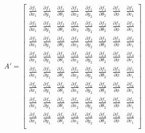 \begin{equation}
   A' = 
    \begin{bmatrix}
    \frac{\partial f_1}{\partial x_1} & \frac{\partial f_1}{\partial y_1} & \frac{\partial f_1}{\partial \theta_1} & \frac{\partial f_1}{\partial x_2} & \frac{\partial f_1}{\partial y_2} & \frac{\partial f_1}{\partial \theta_2} & \frac{\partial f_1}{\partial \phi} & \frac{\partial f_1}{\partial v_1} \\
    \frac{\partial f_2}{\partial x_1} & \frac{\partial f_2}{\partial y_1} & \frac{\partial f_2}{\partial \theta_1} & \frac{\partial f_2}{\partial x_2} & \frac{\partial f_2}{\partial y_2} & \frac{\partial f_2}{\partial \theta_2} & \frac{\partial f_2}{\partial \phi} & \frac{\partial f_2}{\partial v_1} \\
    \frac{\partial f_3}{\partial x_1} & \frac{\partial f_3}{\partial y_1} & \frac{\partial f_3}{\partial \theta_1} & \frac{\partial f_3}{\partial x_2} & \frac{\partial f_3}{\partial y_2} & \frac{\partial f_3}{\partial \theta_2} & \frac{\partial f_3}{\partial \phi} & \frac{\partial f_3}{\partial v_1} \\
    \frac{\partial f_4}{\partial x_1} & \frac{\partial f_4}{\partial y_1} & \frac{\partial f_4}{\partial \theta_1} & \frac{\partial f_4}{\partial x_2} & \frac{\partial f_4}{\partial y_2} & \frac{\partial f_4}{\partial \theta_2} & \frac{\partial f_4}{\partial \phi} & \frac{\partial f_4}{\partial v_1} \\
    \frac{\partial f_5}{\partial x_1} & \frac{\partial f_5}{\partial y_1} & \frac{\partial f_5}{\partial \theta_1} & \frac{\partial f_5}{\partial x_2} & \frac{\partial f_5}{\partial y_2} & \frac{\partial f_5}{\partial \theta_2} & \frac{\partial f_5}{\partial \phi} & \frac{\partial f_5}{\partial v_1} \\
    \frac{\partial f_6}{\partial x_1} & \frac{\partial f_6}{\partial y_1} & \frac{\partial f_6}{\partial \theta_1} & \frac{\partial f_6}{\partial x_2} & \frac{\partial f_6}{\partial y_2} & \frac{\partial f_6}{\partial \theta_2} & \frac{\partial f_6}{\partial \phi} & \frac{\partial f_6}{\partial v_1} \\
    \frac{\partial f_7}{\partial x_1} & \frac{\partial f_7}{\partial y_1} & \frac{\partial f_7}{\partial \theta_1} & \frac{\partial f_7}{\partial x_2} & \frac{\partial f_7}{\partial y_2} & \frac{\partial f_7}{\partial \theta_2} & \frac{\partial f_7}{\partial \phi} & \frac{\partial f_7}{\partial v_1} \\
    \frac{\partial f_8}{\partial x_1} & \frac{\partial f_8}{\partial y_1} & \frac{\partial f_8}{\partial \theta_1} & \frac{\partial f_8}{\partial x_2} & \frac{\partial f_8}{\partial y_2} & \frac{\partial f_8}{\partial \theta_2} & \frac{\partial f_8}{\partial \phi} & \frac{\partial f_8}{\partial v_1} \\
    \end{bmatrix}
\end{equation}

